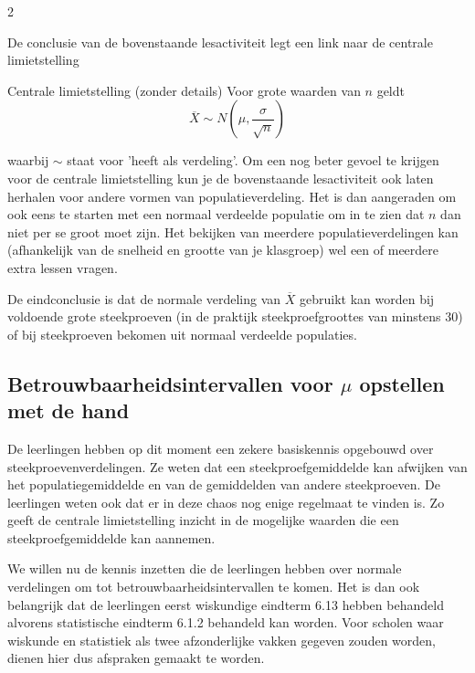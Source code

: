 \begin{multicols}{2}

De conclusie van de bovenstaande lesactiviteit legt een link naar de centrale limietstelling
\begin{kader}{}{Centrale limietstelling (zonder details)}
Voor grote waarden van $n$ geldt
\[ \overline{X} \sim N \left( \mu, \frac{\sigma}{\sqrt{n}}\right)\] 
\end{kader}
waarbij $\sim$ staat voor 'heeft als verdeling'.
Om een nog beter gevoel te krijgen voor de centrale limietstelling kun je de bovenstaande lesactiviteit ook laten herhalen voor andere vormen van populatieverdeling. Het is dan aangeraden om ook eens te starten met een normaal verdeelde populatie om in te zien dat $n$ dan niet per se groot moet zijn. Het bekijken van meerdere populatieverdelingen kan (afhankelijk van de snelheid en grootte van je klasgroep) wel een of meerdere extra lessen vragen. 

De eindconclusie is dat de normale verdeling van $\overline{X}$ gebruikt kan worden bij voldoende grote steekproeven (in de praktijk steekproefgroottes van minstens 30) of bij steekproeven bekomen uit normaal verdeelde populaties. 





\subsection*{Betrouwbaarheidsintervallen voor $\mu$ opstellen met de hand}

De leerlingen hebben op dit moment een zekere basiskennis opgebouwd over steekproevenverdelingen. Ze weten dat een steekproefgemiddelde kan afwijken van het populatiegemiddelde en van de gemiddelden van andere steekproeven. De leerlingen weten ook dat er in deze chaos nog enige regelmaat te vinden is. Zo geeft de centrale limietstelling inzicht in de mogelijke waarden die een steekproefgemiddelde kan aannemen.

We willen nu de kennis inzetten die de leerlingen hebben over normale verdelingen om tot betrouwbaarheidsintervallen te komen. Het is dan ook belangrijk dat de leerlingen eerst wiskundige eindterm 6.13 hebben behandeld alvorens statistische eindterm 6.1.2 behandeld kan worden. Voor scholen waar wiskunde en statistiek als twee afzonderlijke vakken gegeven zouden worden, dienen hier dus afspraken gemaakt te worden.

\clearpage


\end{multicols}
